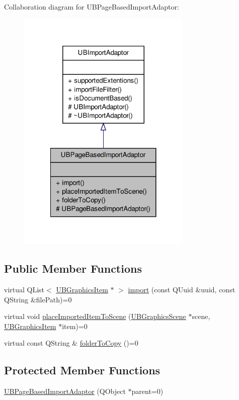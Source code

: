 Collaboration diagram for U\-B\-Page\-Based\-Import\-Adaptor\-:
\nopagebreak
\begin{figure}[H]
\begin{center}
\leavevmode
\includegraphics[width=236pt]{d9/dc5/class_u_b_page_based_import_adaptor__coll__graph}
\end{center}
\end{figure}
\subsection*{Public Member Functions}
\begin{DoxyCompactItemize}
\item 
virtual Q\-List$<$ \hyperlink{class_u_b_graphics_item}{U\-B\-Graphics\-Item} $\ast$ $>$ \hyperlink{class_u_b_page_based_import_adaptor_a1b7b735e0c294078c6c99c2b1c743584}{import} (const Q\-Uuid \&uuid, const Q\-String \&file\-Path)=0
\item 
virtual void \hyperlink{class_u_b_page_based_import_adaptor_a1e9d5e4e33abbe6982db4292cdd9ec7a}{place\-Imported\-Item\-To\-Scene} (\hyperlink{class_u_b_graphics_scene}{U\-B\-Graphics\-Scene} $\ast$scene, \hyperlink{class_u_b_graphics_item}{U\-B\-Graphics\-Item} $\ast$item)=0
\item 
virtual const Q\-String \& \hyperlink{class_u_b_page_based_import_adaptor_a763357fad905103ed572b9a290378d74}{folder\-To\-Copy} ()=0
\end{DoxyCompactItemize}
\subsection*{Protected Member Functions}
\begin{DoxyCompactItemize}
\item 
\hyperlink{class_u_b_page_based_import_adaptor_a969304bb4fbe7e348ce85ac4742d8ff3}{U\-B\-Page\-Based\-Import\-Adaptor} (Q\-Object $\ast$parent=0)
\end{DoxyCompactItemize}


